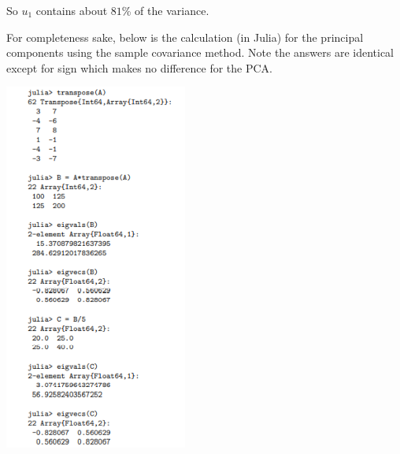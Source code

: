 \documentclass{article}
\begin{document}
So $u_1$ contains about $81$\% of the variance.

For completeness sake, below is the calculation (in Julia) for the principal components using the sample covariance method. Note the answers are identical except for sign which makes no difference for the PCA.
\bigskip

\begin{center}
\includegraphics[width=6cm]{(19).png}
\end{center}
\end{document}
